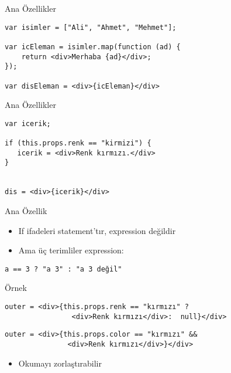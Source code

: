 \documentclass[presentation]{beamer}
\begin{document}
\begin{frame}[fragile,label=sec-7]{Ana Özellikler}
 \begin{verbatim}
var isimler = ["Ali", "Ahmet", "Mehmet"];

var icEleman = isimler.map(function (ad) {
    return <div>Merhaba {ad}</div>;
});

var disEleman = <div>{icEleman}</div>
\end{verbatim}
\end{frame}

\begin{frame}[fragile,label=sec-8]{Ana Özellikler}
 \begin{verbatim}
var icerik;

if (this.props.renk == "kirmizi") {
   icerik = <div>Renk kırmızı.</div>
}


dis = <div>{icerik}</div>
\end{verbatim}
\end{frame}

\begin{frame}[fragile,label=sec-9]{Ana Özellik}
 \begin{itemize}
\item If ifadeleri statement'tır, expression değildir
\item Ama üç terimliler expression:
\end{itemize}
\begin{verbatim}
a == 3 ? "a 3" : "a 3 değil"
\end{verbatim}

\begin{block}{Örnek}
\begin{verbatim}
outer = <div>{this.props.renk == "kırmızı" ?
                <div>Renk kırmızı</div>:  null}</div>
\end{verbatim}

\begin{verbatim}
outer = <div>{this.props.color == "kırmızı" &&
               <div>Renk kırmızı</div>}</div>
\end{verbatim}

\begin{itemize}
\item Okumayı zorlaştırabilir
\end{itemize}
\end{block}
\end{frame}
\end{document}
